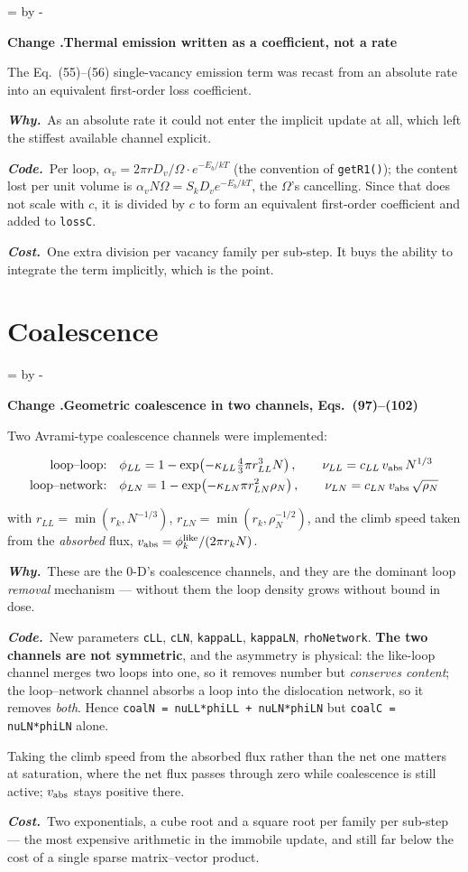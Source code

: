 \documentclass[11pt,a4paper]{article}
\newcommand{\code}[1]{\texttt{\small #1}}
\newcommand{\Om}{\ensuremath{\Omega}}
\newcommand{\needlines}[1]{%
  \par\dimen0=\pagegoal \advance\dimen0 by -\pagetotal
  \ifdim\dimen0<#1\baselineskip \newpage \fi}
\newcounter{chg}
\newcommand{\change}[1]{%
  \needlines{4}%
  \refstepcounter{chg}%
  \par\medskip\noindent
  {\bfseries\boldmath Change \thechg.\quad #1}%
  \par\nobreak\smallskip}
\newcommand{\why}[1]{\par\noindent\textbf{\itshape Why.}\ #1\par}
\newcommand{\impact}[1]{\par\noindent\textbf{\itshape Code.}\ #1\par}
\newcommand{\cost}[1]{\par\noindent\textbf{\itshape Cost.}\ #1\par}
\begin{document}
\change{Thermal emission written as a coefficient, not a rate}
\label{chg:emission}
The Eq.~(55)--(56) single-vacancy emission term was recast from an absolute
rate into an equivalent first-order loss coefficient.
\why{As an absolute rate it could not enter the implicit update at all, which
left the stiffest available channel explicit.}
\impact{Per loop, $\alpha_v = 2\pi r D_v/\Om \cdot e^{-E_b/kT}$ (the
convention of \code{getR1()}); the content lost per unit volume is
$\alpha_v N \Om = S_k D_v e^{-E_b/kT}$, the \Om's cancelling. Since that does
not scale with $c$, it is divided by $c$ to form an equivalent first-order
coefficient and added to \code{lossC}.}
\cost{One extra division per vacancy family per sub-step. It buys the ability
to integrate the term implicitly, which is the point.}

\section{Coalescence}

\change{Geometric coalescence in two channels, Eqs.\ (97)--(102)}
\label{chg:coalescence}
Two Avrami-type coalescence channels were implemented:

\begin{align*}
\text{loop--loop:}\quad &
  \phi_{LL} = 1-\exp\!\left(-\kappa_{LL}\tfrac{4}{3}\pi r_{LL}^3 N\right),
  \qquad \nu_{LL} = c_{LL}\,v_{\rm abs}\,N^{1/3} \\
\text{loop--network:}\quad &
  \phi_{LN} = 1-\exp\!\left(-\kappa_{LN}\pi r_{LN}^2 \rho_N\right),
  \qquad \nu_{LN} = c_{LN}\,v_{\rm abs}\,\sqrt{\rho_N}
\end{align*}

\noindent
with $r_{LL} = \min(r_k, N^{-1/3})$, $r_{LN} = \min(r_k, \rho_N^{-1/2})$, and
the climb speed taken from the \emph{absorbed} flux,
$v_{\rm abs} = \phi^{\rm like}_k / (2\pi r_k N)$.
\why{These are the 0-D's coalescence channels, and they are the dominant loop
\emph{removal} mechanism --- without them the loop density grows without bound
in dose.}
\impact{New parameters \code{cLL}, \code{cLN}, \code{kappaLL},
\code{kappaLN}, \code{rhoNetwork}. \textbf{The two channels are not
symmetric}, and the asymmetry is physical: the like-loop channel merges two
loops into one, so it removes number but \emph{conserves content}; the
loop--network channel absorbs a loop into the dislocation network, so it
removes \emph{both}. Hence \code{coalN = nuLL*phiLL + nuLN*phiLN} but
\code{coalC = nuLN*phiLN} alone.

Taking the climb speed from the absorbed flux rather than the net one matters
at saturation, where the net flux passes through zero while coalescence is
still active; $v_{\rm abs}$ stays positive there.}
\cost{Two exponentials, a cube root and a square root per family per sub-step
--- the most expensive arithmetic in the immobile update, and still far below
the cost of a single sparse matrix--vector product.}
\end{document}

